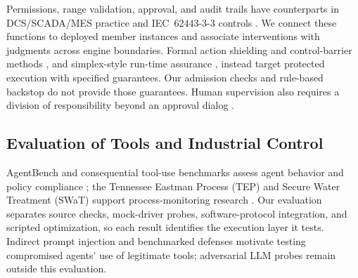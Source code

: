 Permissions, range validation, approval, and audit trails have counterparts
in DCS/SCADA/MES practice and IEC~62443-3-3 controls \cite{iec62443-3-3}.
We connect these functions to deployed member instances and associate
interventions with judgments across engine boundaries. Formal action shielding
and control-barrier methods \cite{alshiekh2018shielding,ames2017cbf}, and
simplex-style run-time assurance \cite{sha2001simplex}, instead target
protected execution with specified guarantees. Our admission checks and
rule-based backstop do not provide those guarantees. Human supervision also
requires a division of responsibility beyond an approval dialog
\cite{parasuraman2000model,bainbridge1983ironies}.

\subsection{Evaluation of Tools and Industrial Control}
AgentBench and consequential tool-use benchmarks assess agent behavior and
policy compliance \cite{liu2024agentbench,yao2024taubench}; the Tennessee
Eastman Process (TEP) and Secure Water Treatment (SWaT) support
process-monitoring research \cite{downs1993tep,goh2017swat}. Our
evaluation separates source checks, mock-driver probes, software-protocol
integration, and scripted optimization, so each result identifies the
execution layer it tests. Indirect prompt injection
\cite{greshake2023injection} and benchmarked defenses
\cite{liu2024pinjection} motivate testing compromised agents' use of
legitimate tools; adversarial LLM probes remain outside this evaluation.
